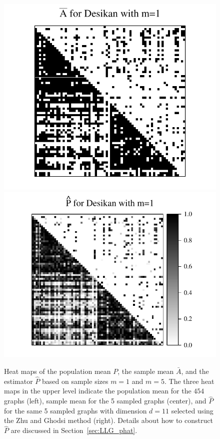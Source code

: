 \begin{figure}[!tbp]
\includegraphics[height=.201\textheight]{./Figures/Abar_desikan_m1.pdf} \hspace{-35pt}
\includegraphics[height=.205\textheight]{./Figures/Phat_desikan_m1.pdf}
\caption[Heat maps of the population mean, the sample mean, and the low-rank estimator]{Heat maps of the population mean $P$, the sample mean $\bar{A}$, and the estimator $\hat{P}$ based on sample sizes $m = 1$ and $m = 5$.
The three heat maps in the upper level indicate the population mean for the $454$ graphs (left), sample mean for the 5 sampled graphs (center), and $\hat{P}$ for the same 5 sampled graphs with dimension $d=11$ selected using the Zhu and Ghodsi method (right). Details about how to construct $\hat{P}$ are discussed in Section~\ref{sec:LLG_phat}.
}
\end{figure}
